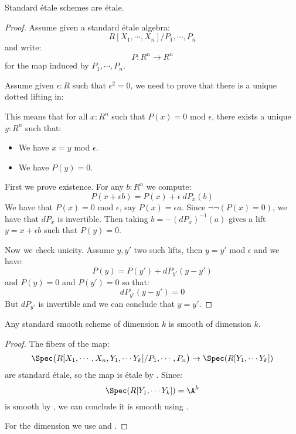 \begin{lemma}\label{standard-etale-are-etale}
Standard étale schemes are étale.
\end{lemma}

\begin{proof}
Assume given a standard étale algebra:
\[R[X_1,\cdots,X_n]/P_1,\cdots,P_n\]
and write:
\[P:R^n\to R^n\]
for the map induced by $P_1,\cdots,P_n$.

Assume given $\epsilon:R$ such that $\epsilon^2=0$, we need to prove that there is a unique dotted lifting in:
  \begin{center}
    \end{center}
This means that for all $x:R^n$ such that $P(x)=0$ mod $\epsilon$, there exists a unique $y:R^n$ such that:
\begin{itemize} 
\item We have $x=y$ mod $\epsilon$.
\item We have $P(y)=0$.
\end{itemize}

First we prove existence. For any $b:R^n$ we compute:
\[P(x+\epsilon b) = P(x) + \epsilon\ dP_x(b)\]
We have that $P(x)=0$ mod $\epsilon$, say $P(x) = \epsilon a$. Since $\neg\neg(P(x) = 0)$, we have that $dP_x$ is invertible. Then taking $b = -(dP_x)^{-1}(a)$ gives a lift $y=x+\epsilon b$ such that $P(y) = 0$.

Now we check unicity. Assume $y,y'$ two such lifts, then $y=y'$ mod $\epsilon$ and we have:
\[P(y) = P(y') + dP_{y'}(y-y')\]
and $P(y)=0$ and $P(y')=0$ so that:
\[dP_{y'}(y-y') = 0\]
But $dP_{y'}$ is invertible and we can conclude that $y=y'$.
\end{proof}

\begin{lemma}\label{standard-smooth-is-smooth}
Any standard smooth scheme of dimension $k$ is smooth of dimension $k$. %
\end{lemma}

\begin{proof}
The fibers of the map:
\[\Spec\big(R[X_1,\cdots,X_n,Y_1,\cdots Y_{k}] / P_1,\cdots,P_n\big) \to \Spec(R[Y_1,\cdots Y_{k}])\]
are standard étale, so the map is étale by . Since:
\[\Spec(R[Y_1,\cdots Y_{k}]) = \A^k\]
is smooth by , we can conclude it is smooth using . 

For the dimension we use  and .
\end{proof}



